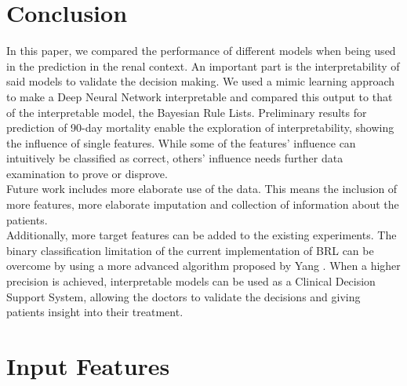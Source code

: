 \documentclass[conference,comsoc]{IEEEtran}
\begin{document}
\section{Conclusion}
In this paper, we compared the performance of different models when being used in the prediction in the renal context.
An important part is the interpretability of said models to validate the decision making.
We used a mimic learning approach to make a Deep Neural Network interpretable and compared this output to that of the interpretable model, the Bayesian Rule Lists.
Preliminary results for prediction of 90-day mortality enable the exploration of interpretability, showing the influence of single features.
While some of the features' influence can intuitively be classified as correct, others' influence needs further data examination to prove or disprove. \\

Future work includes more elaborate use of the data. 
This means the inclusion of more features, more elaborate imputation and collection of information about the patients. \\
Additionally, more target features can be added to the existing experiments. 
The binary classification limitation of the current implementation of BRL can be overcome by using a more advanced algorithm proposed by Yang \cite{Yang2016}.
When a higher precision is achieved, interpretable models can be used as a Clinical Decision Support System, allowing the doctors to validate the decisions and giving patients insight into their treatment.




\onecolumn

\appendices
\section{Input Features}
\label{app:input}
\end{document}
